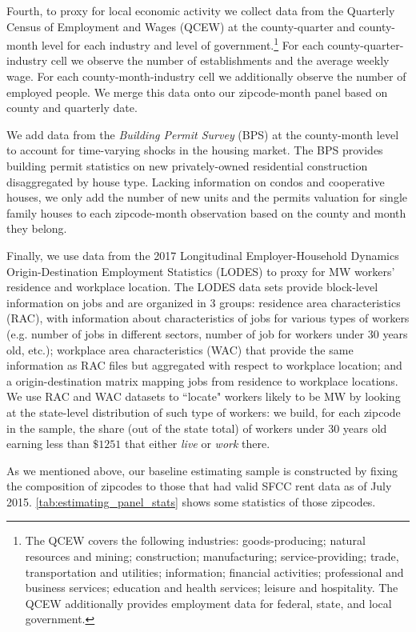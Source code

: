 Fourth, to proxy for local economic activity we collect data from the Quarterly Census of Employment 
and Wages (QCEW) at the county-quarter and county-month level for each industry and level of 
government.\footnote{The QCEW covers the following industries: goods-producing; natural resources and 
	mining; construction; manufacturing; service-providing; trade, transportation and utilities; 
	information; financial activities; professional and business services; education and health 
	services; leisure and hospitality. The QCEW additionally provides employment data for federal, 
	state, and local government.} 
For each county-quarter-industry cell we observe the number of establishments and the average weekly 
wage. For each county-month-industry cell we additionally observe the number of employed people. We 
merge this data onto our zipcode-month panel based on county and quarterly date.

We add data from the \textit{Building Permit Survey} (BPS) at the county-month level to account for 
time-varying shocks in the housing market. The BPS provides building permit statistics on new 
privately-owned residential construction disaggregated by house type. Lacking information on condos 
and cooperative houses, we only add the number of new units and the permits valuation for single 
family houses to each zipcode-month observation based on the county and month they belong.

Finally, we use data from the 2017 Longitudinal Employer-Household Dynamics Origin-Destination 
Employment Statistics (LODES) to proxy for MW workers' residence and workplace location. The LODES 
data sets provide block-level information on jobs and are organized in 3 groups: residence area 
characteristics (RAC), with information about characteristics of jobs for various types of workers 
(e.g. number of jobs in different sectors, number of job for workers under 30 years old, etc.); 
workplace area characteristics (WAC) that provide the same information as RAC files but aggregated 
with respect to workplace location; and a origin-destination matrix mapping jobs from residence to 
workplace locations. We use RAC and WAC datasets to ``locate" workers likely to be MW by looking at 
the state-level distribution of such type of workers: we build, for each zipcode in the sample, the 
share (out of the state total) of workers under 30 years old earning less than $\$1251$ that either 
\textit{live} or \textit{work} there. 

As we mentioned above, our baseline estimating sample is constructed by fixing the composition of 
zipcodes to those that had valid SFCC rent data as of July 2015. \autoref{tab:estimating_panel_stats}
shows some statistics of those zipcodes. %

